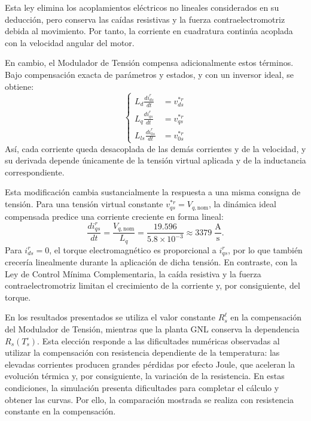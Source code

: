 \documentclass[blue,fullpaper]{ludusofficial}  %
\begin{document}
Esta ley elimina los acoplamientos eléctricos no lineales
considerados en su deducción, pero conserva las caídas resistivas
y la fuerza contraelectromotriz debida al movimiento. Por tanto,
la corriente en cuadratura continúa acoplada con la velocidad
angular del motor.

En cambio, el Modulador de Tensión compensa adicionalmente estos
términos. Bajo compensación exacta de parámetros y estados, y con
un inversor ideal, se obtiene:
\begin{equation}
\left\{
\begin{aligned}
    L_d \frac{di_{ds}^{r}}{dt} &= v_{ds}^{*r} \\
    L_q \frac{di_{qs}^{r}}{dt} &= v_{qs}^{*r} \\
    L_{ls} \frac{di_{0s}^{r}}{dt} &= v_{0s}^{*r}
\end{aligned}
\right.
\label{eq:corrientes-modulador-tension}
\end{equation}
Así, cada corriente queda desacoplada de las demás corrientes y
de la velocidad, y su derivada depende únicamente de la tensión
virtual aplicada y de la inductancia correspondiente.

Esta modificación cambia sustancialmente la respuesta a una
misma consigna de tensión. Para una tensión virtual constante
$v_{qs}^{*r}=V_{q,\mathrm{nom}}$, la dinámica ideal compensada
predice una corriente creciente en forma lineal:
\begin{equation}
    \frac{di_{qs}^{r}}{dt}
    = \frac{V_{q,\mathrm{nom}}}{L_q}
    = \frac{19.596}{5.8\times10^{-3}}
    \approx 3379\;\mathrm{\frac{A}{s}}.
\end{equation}
Para $i_{ds}^{r}=0$, el torque electromagnético es proporcional
a $i_{qs}^{r}$, por lo que también crecería linealmente durante
la aplicación de dicha tensión. En contraste, con la Ley de
Control Mínima Complementaria, la caída resistiva y la fuerza
contraelectromotriz limitan el crecimiento de la corriente y,
por consiguiente, del torque.

En los resultados presentados se utiliza el valor constante
$R_s^\ell$ en la compensación del Modulador de Tensión, mientras
que la planta GNL conserva la dependencia $R_s(T_s^\circ)$.
Esta elección responde a las dificultades numéricas observadas
al utilizar la compensación con resistencia dependiente de la
temperatura: las elevadas corrientes producen grandes pérdidas
por efecto Joule, que aceleran la evolución térmica y, por
consiguiente, la variación de la resistencia. En estas condiciones,
la simulación presenta dificultades para completar el cálculo
y obtener las curvas. Por ello, la comparación mostrada se
realiza con resistencia constante en la compensación.
\end{document}
